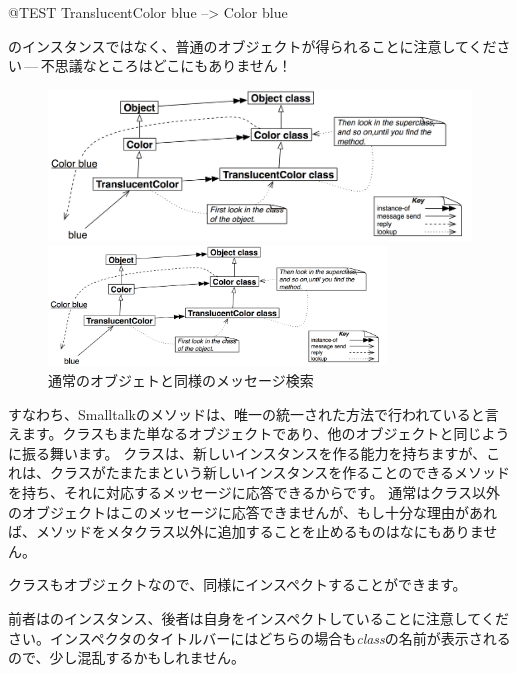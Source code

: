 \documentclass[a4paper,10pt,twoside]{book}
\begin{document}
\begin{code}{@TEST}
TranslucentColor blue --> Color blue
\end{code}
\noindent
{}のインスタンスではなく、普通のオブジェクトが得られることに注意してください\,---\,不思議なところはどこにもありません！

\begin{center}
\begin{figure}[!ht]
\ifluluelse
	{\centerline {\includegraphics[width=\textwidth]{TranslucentColorBlue}}}
	{\centerline {\includegraphics[width=0.8\textwidth]{TranslucentColorBlue}}}
\caption{通常のオブジェトと同様のメッセージ検索}
\end{figure}
\end{center}

すなわち、Smalltalkのメソッドは、唯一の統一された方法で行われていると言えます。クラスもまた単なるオブジェクトであり、他のオブジェクトと同じように振る舞います。
クラスは、新しいインスタンスを作る能力を持ちますが、これは、クラスがたまたまという新しいインスタンスを作ることのできるメソッドを持ち、それに対応するメッセージに応答できるからです。
通常はクラス以外のオブジェクトはこのメッセージに応答できませんが、もし十分な理由があれば、メソッドをメタクラス以外に追加することを止めるものはなにもありません。

クラスもオブジェクトなので、同様にインスペクトすることができます。


\noindent
前者はのインスタンス、後者は自身をインスペクトしていることに注意してください。インスペクタのタイトルバーにはどちらの場合も\emph{class}の名前が表示されるので、少し混乱するかもしれません。
\end{document}
